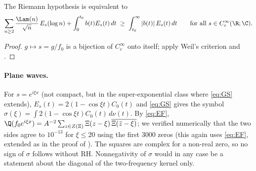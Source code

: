 \begin{corollary}\label{cor:DOM}
The Riemann hypothesis is equivalent to
\begin{equation}\label{eq:DOM}
 \sum_{n\ge2}\frac{\Lam(n)}{\sqrt n}\,E_s(\log n)+\int_0^{t_0}b(t)E_s(t)\,dt\;\ge\;\int_{t_0}^\infty|b(t)|\,E_s(t)\,dt
 \qquad\text{for all }s\in C_c^\infty(\R;\C).
\end{equation}
\end{corollary}
\begin{proof}
$g\mapsto s=g/f_0$ is a bijection of $C_c^\infty$ onto itself; apply Weil's criterion and .
\end{proof}

\paragraph{Plane waves.} For $s=e^{i\xi x}$ (not compact, but in the super-exponential class where \eqref{eq:GS} extends),
$E_s(t)=2(1-\cos\xi t)C_0(t)$ and \eqref{eq:GS} gives the symbol $\sigma(\xi)=\int2(1-\cos\xi t)C_0(t)\,d\nu(t)$. By \eqref{eq:EF},
$\Q(f_0e^{i\xi x})=A^{-2}\sum_{z\in Z(\Xi)}\Xi(z-\xi)\,\overline{\Xi(\bar z-\xi)}$; we verified numerically that the two sides agree to $10^{-13}$ for
$\xi\le20$ using the first $3000$ zeros (this again uses \eqref{eq:EF}, extended as in the proof of ). The squares are complex for a non-real zero, so no sign of $\sigma$ follows without RH. Nonnegativity
of $\sigma$ would in any case be a statement about the diagonal of the two-frequency kernel only.
